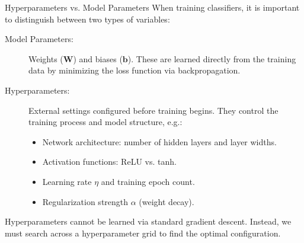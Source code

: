 \documentclass[9pt]{beamer}
\begin{document}
\begin{frame}{Hyperparameters vs. Model Parameters}
  When training classifiers, it is important to distinguish between two types of variables:
  \begin{description}
    \item[Model Parameters:]
      Weights ($\mathbf{W}$) and biases ($\mathbf{b}$). These are learned directly from the training data by minimizing the loss function via backpropagation.
    \item[Hyperparameters:]
      External settings configured before training begins. They control the training process and model structure, e.g.:
      \begin{itemize}
        \item Network architecture: number of hidden layers and layer widths.
        \item Activation functions: ReLU vs. tanh.
        \item Learning rate $\eta$ and training epoch count.
        \item Regularization strength $\alpha$ (weight decay).
      \end{itemize}
  \end{description}
  Hyperparameters cannot be learned via standard gradient descent. Instead, we must search across a hyperparameter grid to find the optimal configuration.
\end{frame}
\end{document}
